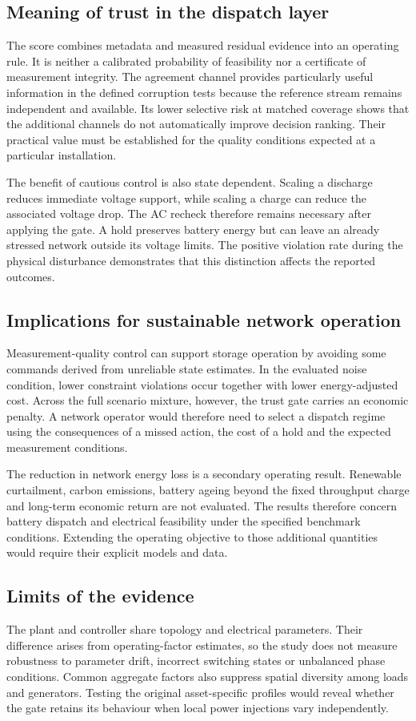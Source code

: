 \documentclass[11pt,a4paper]{article}
\begin{document}
\subsection{Meaning of trust in the dispatch layer}
The score combines metadata and measured residual evidence into an operating rule. It is neither a calibrated probability of feasibility nor a certificate of measurement integrity. The agreement channel provides particularly useful information in the defined corruption tests because the reference stream remains independent and available. Its lower selective risk at matched coverage shows that the additional channels do not automatically improve decision ranking. Their practical value must be established for the quality conditions expected at a particular installation.

The benefit of cautious control is also state dependent. Scaling a discharge reduces immediate voltage support, while scaling a charge can reduce the associated voltage drop. The AC recheck therefore remains necessary after applying the gate. A hold preserves battery energy but can leave an already stressed network outside its voltage limits. The positive violation rate during the physical disturbance demonstrates that this distinction affects the reported outcomes.

\subsection{Implications for sustainable network operation}
Measurement-quality control can support storage operation by avoiding some commands derived from unreliable state estimates. In the evaluated noise condition, lower constraint violations occur together with lower energy-adjusted cost. Across the full scenario mixture, however, the trust gate carries an economic penalty. A network operator would therefore need to select a dispatch regime using the consequences of a missed action, the cost of a hold and the expected measurement conditions.

The reduction in network energy loss is a secondary operating result. Renewable curtailment, carbon emissions, battery ageing beyond the fixed throughput charge and long-term economic return are not evaluated. The results therefore concern battery dispatch and electrical feasibility under the specified benchmark conditions. Extending the operating objective to those additional quantities would require their explicit models and data.

\subsection{Limits of the evidence}
The plant and controller share topology and electrical parameters. Their difference arises from operating-factor estimates, so the study does not measure robustness to parameter drift, incorrect switching states or unbalanced phase conditions. Common aggregate factors also suppress spatial diversity among loads and generators. Testing the original asset-specific profiles would reveal whether the gate retains its behaviour when local power injections vary independently.
\end{document}
